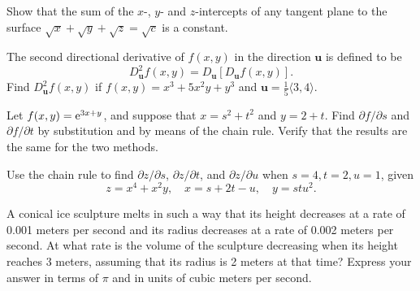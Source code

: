 \documentclass[prettycode,shellescape]{watsonbook}
\begin{document}
\begin{aexercise}
  Show that the sum of the $x$-, $y$- and $z$-intercepts of any
  tangent plane to the surface
  $\sqrt{x} + \sqrt{y} + \sqrt{z} = \sqrt{c}$ is a constant.
\end{aexercise}

\begin{aexercise}
  The second directional derivative of $f(x,y)$ in the direction
  $\mathbf{u}$ is defined to be
  \[
    D_\mathbf{u}^2 f(x,y) = D_\mathbf{u}[D_{\mathbf{u}} f(x,y)].
  \]
  Find $D_\mathbf{u}^2 f(x,y)$ if $f(x,y) = x^3 + 5x^2y + y^3$ and
  $\mathbf{u} = \frac{1}{5}\langle 3,4\rangle$.
\end{aexercise}




\begin{aexercise}
  Let $f(x,y)=\mathrm{e}^{3x+y}$, and suppose that $x=s^2+t^2$ and
  $y=2+t$. Find $\partial f/\partial s$ and $\partial f/\partial t$ by
  substitution and by means of the chain rule. Verify that the results
  are the same for the two methods.
\end{aexercise}


\begin{aexercise}
  Use the chain rule to find $\partial z/\partial s$, $\partial
  z/\partial t$, and $\partial z/\partial u$ when $s=4, t = 2, u=1$, given 
  \[
    z = x^4 + x^2y, \quad x = s + 2t - u, \quad y = stu^2.
  \]
\end{aexercise}

\begin{aexercise}
  A conical ice sculpture melts in such a way that its height
  decreases at a rate of 0.001 meters per second and its radius
  decreases at a rate of 0.002 meters per second. At what rate is the
  volume of the sculpture decreasing when its height reaches 3 meters,
  assuming that its radius is 2 meters at that time? Express your
  answer in terms of $\pi$ and in units of cubic meters per second.
\end{aexercise}

\end{document}
